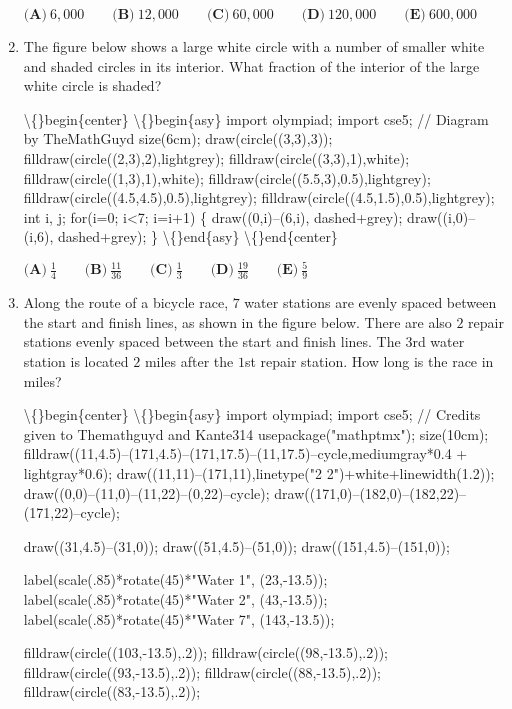 \documentclass{article}
\begin{document}
\begin{enumerate}[label=\arabic*., itemsep=0.5em]
\(\textbf{(A)}\ 6{,}000 \qquad \textbf{(B)}\ 12{,}000 \qquad \textbf{(C)}\ 60{,}000 \qquad \textbf{(D)}\ 120{,}000 \qquad \textbf{(E)}\ 600{,}000\)\par \vspace{0.5em}\item The figure below shows a large white circle with a number of smaller white and shaded circles in its
interior. What fraction of the interior of the large white circle is shaded?


\textbackslash\{\}begin\{center\}
\textbackslash\{\}begin\{asy\}
import olympiad;
import cse5;
// Diagram by TheMathGuyd
size(6cm);
draw(circle((3,3),3));
filldraw(circle((2,3),2),lightgrey);
filldraw(circle((3,3),1),white);
filldraw(circle((1,3),1),white);
filldraw(circle((5.5,3),0.5),lightgrey);
filldraw(circle((4.5,4.5),0.5),lightgrey);
filldraw(circle((4.5,1.5),0.5),lightgrey);
int i, j;
for(i=0; i<7; i=i+1)
\{
draw((0,i)--(6,i), dashed+grey);
draw((i,0)--(i,6), dashed+grey);
\}
\textbackslash\{\}end\{asy\}
\textbackslash\{\}end\{center\}


\(\textbf{(A)}\ \frac{1}{4} \qquad \textbf{(B)}\ \frac{11}{36} \qquad \textbf{(C)}\ \frac{1}{3} \qquad \textbf{(D)}\ \frac{19}{36} \qquad \textbf{(E)}\ \frac{5}{9}\)\par \vspace{0.5em}\item Along the route of a bicycle race, \(7\) water stations are evenly spaced between the start and finish lines,
as shown in the figure below. There are also \(2\) repair stations evenly spaced between the start and
finish lines. The \(3\)rd water station is located \(2\) miles after the \(1\)st repair station. How long is the race
in miles?

\textbackslash\{\}begin\{center\}
\textbackslash\{\}begin\{asy\}
import olympiad;
import cse5;
// Credits given to Themathguyd and Kante314
usepackage("mathptmx");
size(10cm);
filldraw((11,4.5)--(171,4.5)--(171,17.5)--(11,17.5)--cycle,mediumgray*0.4 + lightgray*0.6);
draw((11,11)--(171,11),linetype("2 2")+white+linewidth(1.2));
draw((0,0)--(11,0)--(11,22)--(0,22)--cycle);
draw((171,0)--(182,0)--(182,22)--(171,22)--cycle);

draw((31,4.5)--(31,0));
draw((51,4.5)--(51,0));
draw((151,4.5)--(151,0));

label(scale(.85)*rotate(45)*"Water 1", (23,-13.5));
label(scale(.85)*rotate(45)*"Water 2", (43,-13.5));
label(scale(.85)*rotate(45)*"Water 7", (143,-13.5));

filldraw(circle((103,-13.5),.2));
filldraw(circle((98,-13.5),.2));
filldraw(circle((93,-13.5),.2));
filldraw(circle((88,-13.5),.2));
filldraw(circle((83,-13.5),.2));


\end{enumerate}
\end{document}

